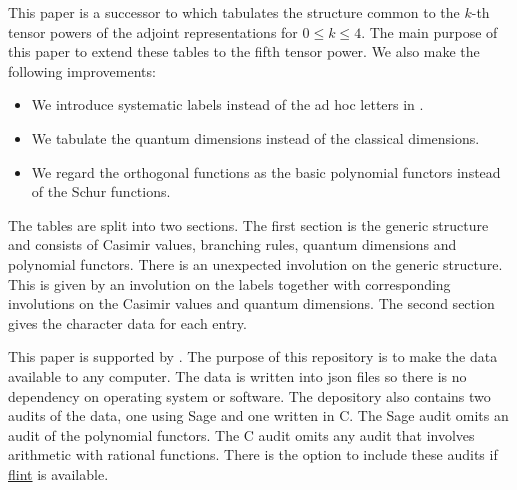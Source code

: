 \documentclass[12pt]{amsart}
\begin{document}
This paper is a successor to \cite{cohen1996} which tabulates the structure common to the $k$-th 
tensor powers of the adjoint representations for $0\leqslant k \leqslant 4$. The main purpose
of this paper to extend these tables to the fifth tensor power. We also make the following
improvements:
\begin{itemize}
	\item We introduce systematic labels instead of the ad hoc letters in \cite{cohen1996}.
	\item We tabulate the quantum dimensions instead of the classical dimensions.
	\item We regard the orthogonal functions as the basic polynomial functors instead
	of the Schur functions.
\end{itemize}

The tables are split into two sections. The first section is the generic structure and consists of
Casimir values, branching rules, quantum dimensions and polynomial functors. There is an unexpected
involution on the generic structure. This is given by an involution on the labels together
with corresponding involutions on the Casimir values and quantum dimensions.
The second section gives the character data for each entry.

This paper is supported by \cite{Westbury2026}. The purpose of this repository is to make the
data available to any computer. The data is written into json files so there is no dependency
on operating system or software. The depository also contains two audits of the data, one
using Sage and one written in C. The Sage audit omits an audit of the polynomial functors.
The C audit omits any audit that involves arithmetic with rational functions. There is the
option to include these audits if \href{https://flintlib.org/}{flint} is available.
\end{document}

